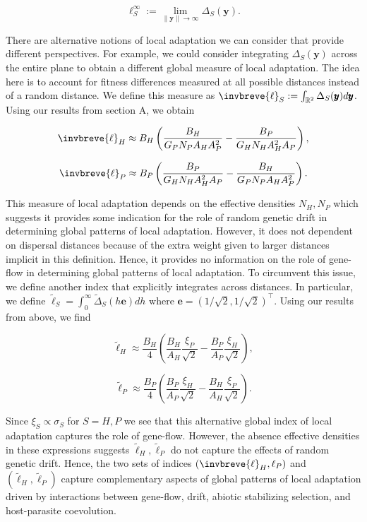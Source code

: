 \documentclass{article}
\begin{document}
\[\ell_S^\infty:=\lim_{\|\pmb y\|\to\infty}\Delta_S(\pmb y).\]

There are alternative notions of local adaptation we can consider that
provide different perspectives. For example, we could consider
integrating \(\Delta_S(\pmb y)\) across the entire plane to obtain a
different global measure of local adaptation. The idea here is to
account for fitness differences measured at all possible distances
instead of a random distance. We define this measure as
\(\invbreve{\ell}_S:=\int_{\mathbb R^2}\Delta_S(\pmb y)d\pmb y\). Using
our results from section A, we obtain

\[\invbreve{\ell}_H\approx B_H\left(\frac{B_H}{G_PN_PA_HA_P^2}-\frac{B_P}{G_HN_HA_H^2A_P}\right),\]

\[\invbreve{\ell}_P\approx B_P\left(\frac{B_P}{G_HN_HA_H^2A_P}-\frac{B_H}{G_PN_PA_HA_P^2}\right).\]

This measure of local adaptation depends on the effective densities
\(N_H,N_P\) which suggests it provides some indication for the role of
random genetic drift in determining global patterns of local adaptation.
However, it does not dependent on dispersal distances because of the
extra weight given to larger distances implicit in this definition.
Hence, it provides no information on the role of gene-flow in
determining global patterns of local adaptation. To circumvent this
issue, we define another index that explicitly integrates across
distances. In particular, we define
\(\tilde{\ell}_S=\int_0^\infty\tilde\Delta_S(h\pmb e)dh\) where
\(\pmb e=(1/\sqrt2,1/\sqrt2)^\top\). Using our results from above, we
find

\[\tilde{\ell}_H\approx\frac{B_H}{4}\left(\frac{B_H}{A_H}\frac{\xi_P}{\sqrt2}-\frac{B_P}{A_P}\frac{\xi_H}{\sqrt2}\right),\]

\[\tilde{\ell}_P\approx\frac{B_P}{4}\left(\frac{B_P}{A_P}\frac{\xi_H}{\sqrt2}-\frac{B_H}{A_H}\frac{\xi_P}{\sqrt2}\right).\]

Since \(\xi_S\propto\sigma_S\) for \(S=H,P\) we see that this
alternative global index of local adaptation captures the role of
gene-flow. However, the absence effective densities in these expressions
suggests \(\tilde{\ell}_H,\tilde{\ell}_P\) do not capture the effects of
random genetic drift. Hence, the two sets of indices
\((\invbreve{\ell}_H,{\ell}_P)\) and \((\tilde{\ell}_H,\tilde{\ell}_P)\)
capture complementary aspects of global patterns of local adaptation
driven by interactions between gene-flow, drift, abiotic stabilizing
selection, and host-parasite coevolution.
\end{document}
